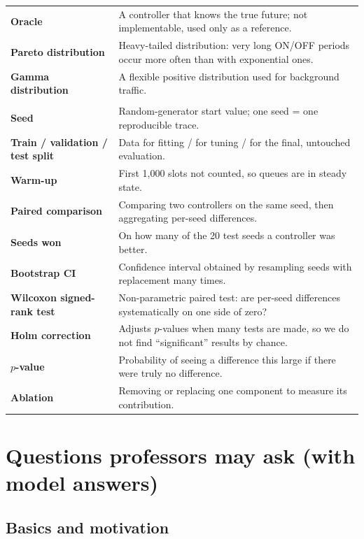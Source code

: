 \documentclass[11pt,a4paper]{article}
\begin{document}
\begin{longtable}{>{\raggedright\arraybackslash\bfseries}p{3.6cm}>{\raggedright\arraybackslash}p{12.2cm}}
Oracle & A controller that knows the true future; not implementable, used only as a reference. \\
Pareto distribution & Heavy-tailed distribution: very long ON/OFF periods occur more often than with exponential ones. \\
Gamma distribution & A flexible positive distribution used for background traffic. \\
\multicolumn{2}{l}{\color{iitblue}\normalsize\textbf{Statistics}}\\
Seed & Random-generator start value; one seed = one reproducible trace. \\
Train / validation / test split & Data for fitting / for tuning / for the final, untouched evaluation. \\
Warm-up & First 1{,}000 slots not counted, so queues are in steady state. \\
Paired comparison & Comparing two controllers on the same seed, then aggregating per-seed differences. \\
Seeds won & On how many of the 20 test seeds a controller was better. \\
Bootstrap CI & Confidence interval obtained by resampling seeds with replacement many times. \\
Wilcoxon signed-rank test & Non-parametric paired test: are per-seed differences systematically on one side of zero? \\
Holm correction & Adjusts $p$-values when many tests are made, so we do not find ``significant'' results by chance. \\
$p$-value & Probability of seeing a difference this large if there were truly no difference. \\
Ablation & Removing or replacing one component to measure its contribution. \\
\end{longtable}
\normalsize

\section{Questions professors may ask (with model answers)}

\subsection{Basics and motivation}
\end{document}
